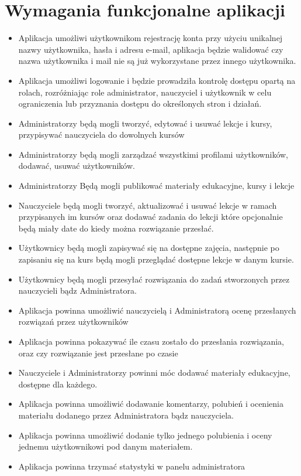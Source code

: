 \section{Wymagania funkcjonalne aplikacji}
\begin{itemize}
\item Aplikacja umożliwi użytkownikom rejestrację konta przy użyciu unikalnej nazwy użytkownika, hasła i adresu e-mail, aplikacja będzie walidować czy nazwa użytkownika i mail nie są już wykorzystane przez innego użytkownika.
\item 
Aplikacja umożliwi logowanie i będzie prowadziła kontrolę dostępu opartą na rolach, rozróżniając role administrator, nauczyciel i użytkownik w celu ograniczenia lub przyznania dostępu do określonych stron i działań.
\item Administratorzy będą mogli tworzyć, edytować i usuwać lekcje i kursy, przypisywać nauczyciela do dowolnych kursów
\item Administratorzy będą mogli zarządzać wszystkimi profilami użytkowników, dodawać, usuwać użytkowników.
\item Administratorzy Będą mogli publikować materiały edukacyjne, kursy i lekcje
\item 
Nauczyciele będą mogli tworzyć, aktualizować i usuwać lekcje w ramach przypisanych im kursów oraz dodawać zadania do lekcji które opcjonalnie będą miały date do kiedy można rozwiązanie przesłać.
\item 
Użytkownicy będą mogli zapisywać się na dostępne zajęcia, następnie po zapisaniu się na kurs będą mogli przeglądać dostępne lekcje w danym kursie.
\item Użytkownicy będą mogli przesyłać rozwiązania do zadań stworzonych przez nauczycieli bądz Administratora.
\item Aplikacja powinna umożliwić nauczycielą i Administratorą ocenę przesłanych rozwiązań przez użytkowników
\item Aplikacja powinna pokazywać ile czasu zostało do przesłania rozwiązania, oraz czy rozwiązanie jest przesłane po czasie
\item Nauczyciele i Administratorzy powinni móc dodawać materiały edukacyjne, dostępne dla każdego.
\item Aplikacja powinna umożliwić dodawanie komentarzy, polubień i ocenienia materiału dodanego przez Administratora bądz nauczyciela.
\item Aplikacja powinna umożliwić dodanie tylko jednego polubienia i oceny jednemu użytkownikowi pod danym materiałem.
\item Aplikacja powinna trzymać statystyki w panelu administratora

\end{itemize}

